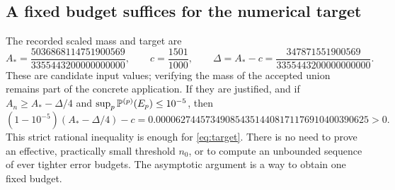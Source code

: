 \subsection{A fixed budget suffices for the numerical target}
The recorded scaled mass and target are
\begin{equation}\label{eq:massnumbers}
 A_* =\frac{5036868114751900569}{3355443200000000000},\qquad
 c=\frac{1501}{1000},\qquad
 \Delta=A_*-c=\frac{347871551900569}{3355443200000000000}.
\end{equation}
These are candidate input values; verifying the mass of the accepted
union remains part of the concrete application. If they are justified,
and if \(A_n\ge A_*-\Delta/4\) and
\(\sup_p\mathbb P^{(p)}(E_p)\le10^{-5}\), then
\[
 (1-10^{-5})(A_*-\Delta/4)-c
 =0.0000627445734908543514408171176910400390625>0.
\]
This strict rational inequality is enough for \eqref{eq:target}.
There is no need to prove an effective, practically small threshold
\(n_0\), or to compute an unbounded sequence of ever tighter error
budgets. The asymptotic argument is a way to obtain one fixed budget.

